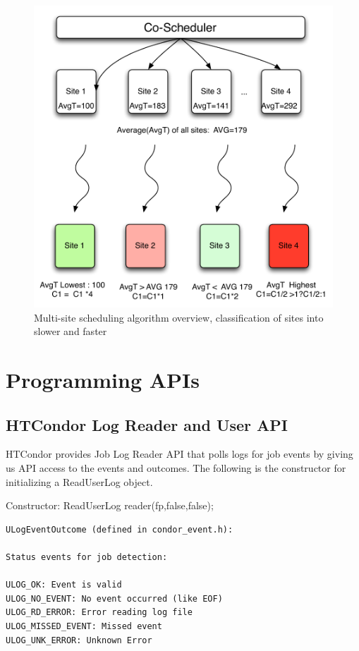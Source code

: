 \documentclass[ms,electronic,double]{nuthesis}
\begin{document}
\begin{figure}[htbp!]
\begin{center}
\includegraphics[scale=0.75]{images/multipleSites}
\caption{Multi-site scheduling algorithm overview, classification of sites into slower and faster}
\label{fig:multiSite1}
\end{center}
\end{figure}
\FloatBarrier

\section{Programming APIs}
\subsection{HTCondor Log Reader and User API}

HTCondor provides Job Log Reader API\cite{manual56} that polls logs for job events by giving us 
API access to the events and outcomes. The following is the constructor for 
initializing a ReadUserLog object.

Constructor:
ReadUserLog reader(fp,false,false);
\begin{verbatim}
ULogEventOutcome (defined in condor_event.h):

Status events for job detection:

ULOG_OK: Event is valid
ULOG_NO_EVENT: No event occurred (like EOF)
ULOG_RD_ERROR: Error reading log file
ULOG_MISSED_EVENT: Missed event
ULOG_UNK_ERROR: Unknown Error
\end{verbatim}
\end{document}
